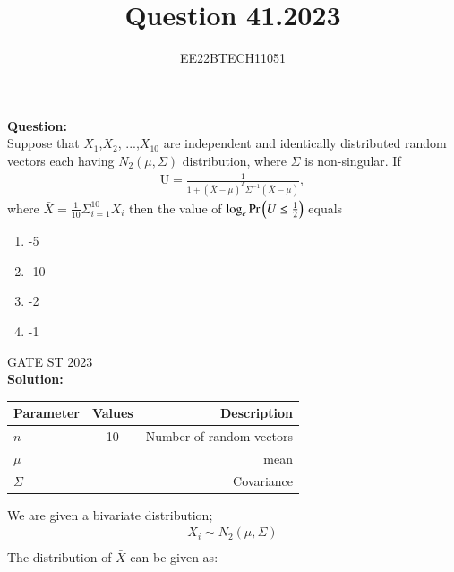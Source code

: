 \documentclass[journal,12pt,onecolumn]{IEEEtran}
\theoremstyle{remark}
\begin{document}

\vspace{3cm}


\title{Question 41.2023}
\author{EE22BTECH11051}

\maketitle
\vspace{3cm}

\textbf{Question:} \\
Suppose that $X_1$,$X_2$, ...,$X_{10}$ are independent and identically distributed random vectors each having
$N_2(\mu,\Sigma)$ distribution, where $\Sigma$ is non-singular. If
\begin{align}
    \text{U} = \frac{1}{1+(\bar{X} - \mu)^T\Sigma^{-1}(\bar{X} - \mu)} ,
\end{align}
where $\bar X = \frac{1}{10}\Sigma_{i = 1}^{10} X_{i}$ then the value of $\log_e \Pr\left(U \le \frac{1}{2}\right)$ equals

\begin{enumerate}
    \item -5
    \item -10
    \item -2
    \item -1
\end{enumerate}
\hfill {GATE ST 2023}\\
\textbf{Solution:}\\
\begin{table}[h!]
    \begin{center}
       \begin{tabular}{|l|c|r|}
       \hline
       Parameter & Values & Description\\
       \hline
       $n$ & 10 & Number of random vectors\\
       \hline
       $\mu$ &  & mean\\
       \hline
       $\Sigma$ &  & Covariance\\
       \hline
       \end{tabular}
       \end{center}
   \end{table}

We are given a bivariate distribution;
\begin{align}
    X_{i} \sim N_2(\mu,\Sigma)\\
\end{align}
The distribution of $\bar{X}$ can be given as: \\
\end{document}
